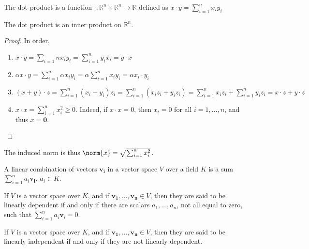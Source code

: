 \documentclass[crop=false,class=book,oneside]{standalone}
\begin{document}
            \begin{definition}
            The dot product is a function $\cdot:\mathbb{R}^n \times \mathbb{R}^n \rightarrow \mathbb{R}$ defined as $x\cdot y = \sum_{i=1}^{n} x_iy_i$
            \end{definition}
            \begin{theorem}
            The dot product is an inner product on $\mathbb{R}^n$.
            \end{theorem}
            \begin{proof}
            In order,
            \begin{enumerate}
            \item $x\cdot y = \sum_{i=1}{n} x_i y_i = \sum_{i=1}^{n} y_i x_i = y\cdot x$
            \item $\alpha x\cdot y = \sum_{i=1}^{n} \alpha x_i y_i = \alpha \sum_{i=1}^{n} x_i y_i = \alpha x_i \cdot y_i$
            \item $(x+y)\cdot z = \sum_{i=1}^{n} (x_i+y_i)z_i = \sum_{i=1}^{n} (x_iz_i +y_i z_i)=\sum_{i=1}^{n}x_i z_i+\sum_{i=1}^{n} y_i z_i = x\cdot z + y\cdot z$
            \item $x\cdot x = \sum_{i=1}^{n} x_i^2 \geq 0$. Indeed, if $x\cdot x = 0$, then $x_i = 0$ for all $i=1,\hdots, n$, and thus $x=\mathbf{0}$.
            \end{enumerate}
            \end{proof}
            \begin{remark}
            The induced norm is thus $\norm{x} = \sqrt{\sum_{i=1}^{n} x_i^2}$.
            \end{remark}
            \begin{definition}
            A linear combination of vectors $\mathbf{v_i}$ in a vector space $V$ over a field $K$ is a sum $\sum_{i=1}^{n} a_i \mathbf{v_i}$, $a_i \in K$.
            \end{definition}
            \begin{definition}
            If $V$ is a vector space over $K$, and if $\mathbf{v_1},\hdots, \mathbf{v_n}\in V$, then they are said to be linearly dependent if and only if there are scalars $a_1,\hdots, a_n$, not all equal to zero, such that $\sum_{i=1}^{n} a_i \mathbf{v}_i = 0$.
            \end{definition}
            \begin{definition}
            If $V$ is a vector space over $K$, and if $\mathbf{v_1},\hdots, \mathbf{v_n}\in V$, then they are said to be linearly independent if and only if they are not linearly dependent.
            \end{definition}
\end{document}
